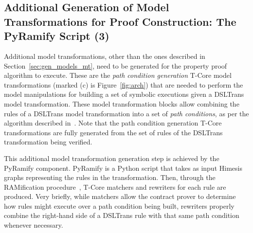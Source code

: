 


\subsection{Additional Generation of Model Transformations for Proof
Construction: The PyRamify Script (3)}

Additional model transformations, other than the ones described in
Section~\ref{sec:gen_models_mt}, need to be generated for the property proof
algorithm to execute. These are the \emph{path condition generation} T-Core
model transformations (marked (c) is Figure~\ref{fig:arch}) that are needed to
perform the model manipulations for building a set of symbolic executions given a DSLTrans
model transformation. These model transformation blocks allow combining the rules of a DSLTrans model
transformation into a set of \emph{path conditions}, as per the algorithm
described in~\cite{Lucio2014}. Note that the path condition generation T-Core
transformations are fully generated from the set of rules of the DSLTrans
transformation being verified.

This additional model transformation generation step is achieved by the PyRamify
component. PyRamify is a Python script that takes as input Himesis graphs
representing the rules in the transformation. Then, through the RAMification
procedure~\cite{KuhneMSVW09}, T-Core matchers and rewriters for each rule are
produced. Very briefly, while matchers allow the contract prover to determine
how rules might execute over a path condition being built, rewriters properly
combine the right-hand side of a DSLTrans rule with that same path condition
whenever necessary.


